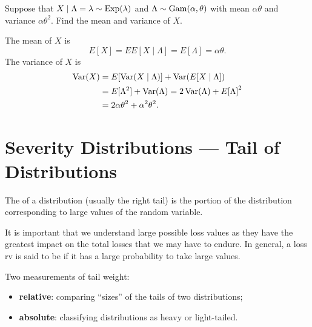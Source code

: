 \documentclass[notoc,notitlepage]{tufte-book}
\begin{document}
\begin{eg}
  Suppose that $X \mid \Lambda = \lambda \sim \operatorname{Exp}(\lambda)$ and $\Lambda \sim \operatorname{Gam}(\alpha, \theta)$ with mean $\alpha \theta$ and variance $\alpha \theta^2$. Find the mean and variance of $X$.
\end{eg}

\begin{solution}
  The mean of $X$ is
  \begin{equation*}
    E[X] = EE[X \mid \Lambda] = E[ \Lambda ] = \alpha\theta.
  \end{equation*}
  The variance of $X$ is
  \begin{align*}
    \operatorname{Var}(X) &= E[\operatorname{Var}(X \mid \Lambda)] + \operatorname{Var}( E[ X \mid \Lambda ] ) \\
            &= E[\Lambda^2] + \operatorname{Var}(\Lambda) = 2\operatorname{Var}(\Lambda) + E{[\Lambda]}^2 \\
            &= 2 \alpha \theta^2 + \alpha^2 \theta^2.
  \end{align*}
\end{solution}



\section{Severity Distributions --- Tail of Distributions}%
\label{sec:severity_distributions_tail_of_distributions}

\begin{defn}[Tail]\label{defn:tail}
  The  of a distribution (usually the right tail) is the portion of the distribution corresponding to large values of the random variable.
\end{defn}

It is important that we understand large possible loss values as they have the greatest impact on the total losses that we may have to endure. In general, a loss rv is said to be  if it has a large probability to take large values.

Two measurements of tail weight:
\begin{itemize}
  \item \textbf{relative}: comparing ``sizes'' of the tails of two distributions;
  \item \textbf{absolute}: classifying distributions as heavy or light-tailed.
\end{itemize}
\end{document}
